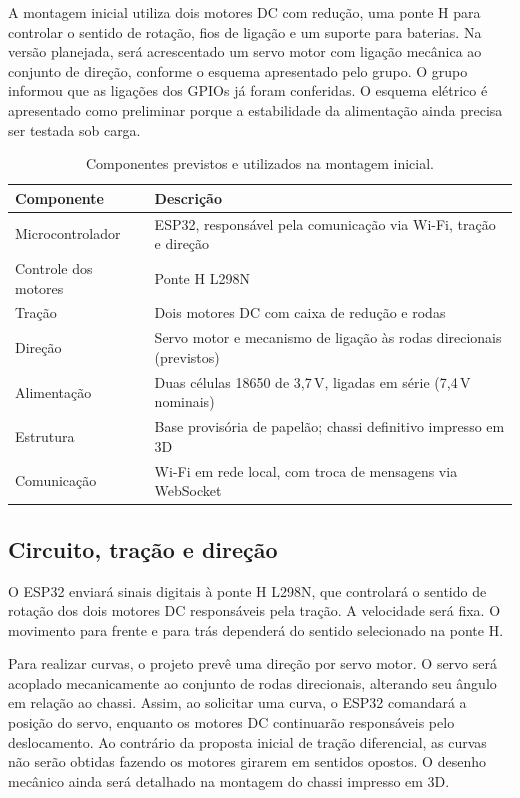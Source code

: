 \documentclass[12pt,a4paper]{article}
\begin{document}
A montagem inicial utiliza dois motores DC com redução, uma ponte H para controlar o
sentido de rotação, fios de ligação e um suporte para baterias. Na versão
planejada, será acrescentado um servo motor com ligação mecânica ao conjunto
de direção, conforme o esquema apresentado pelo grupo. O grupo informou que as ligações dos GPIOs já foram conferidas. O
esquema elétrico é apresentado como preliminar porque a estabilidade da
alimentação ainda precisa ser testada sob carga.

\begin{table}[H]
\centering\small\renewcommand{\arraystretch}{1.3}
\begin{tabularx}{\textwidth}{l >{\raggedright\arraybackslash}X}
\toprule
\textbf{Componente} & \textbf{Descrição} \\
\midrule
Microcontrolador & ESP32, responsável pela comunicação via Wi-Fi, tração e direção \\
Controle dos motores & Ponte H L298N \\
Tração & Dois motores DC com caixa de redução e rodas \\ 
Direção & Servo motor e mecanismo de ligação às rodas direcionais (previstos) \\
Alimentação & Duas células 18650 de 3,7\,V, ligadas em série (7,4\,V nominais) \\
Estrutura & Base provisória de papelão; chassi definitivo impresso em 3D \\
Comunicação & Wi-Fi em rede local, com troca de mensagens via WebSocket \\
\bottomrule
\end{tabularx}
\caption{Componentes previstos e utilizados na montagem inicial.}
\label{tab:componentes}
\end{table}

\subsection{Circuito, tração e direção}
O ESP32 enviará sinais digitais à ponte H L298N, que controlará o sentido
de rotação dos dois motores DC responsáveis pela tração. A velocidade
será fixa. O movimento para frente e para trás dependerá do sentido
selecionado na ponte H.

Para realizar curvas, o projeto prevê uma direção por servo motor.
O servo será acoplado mecanicamente ao conjunto de rodas direcionais,
alterando seu ângulo em relação ao chassi. Assim, ao solicitar uma curva,
o ESP32 comandará a posição do servo, enquanto os motores DC continuarão
responsáveis pelo deslocamento. Ao contrário da proposta inicial de
tração diferencial, as curvas não serão obtidas fazendo os motores
girarem em sentidos opostos. O desenho mecânico ainda será detalhado
na montagem do chassi impresso em 3D.
\end{document}
